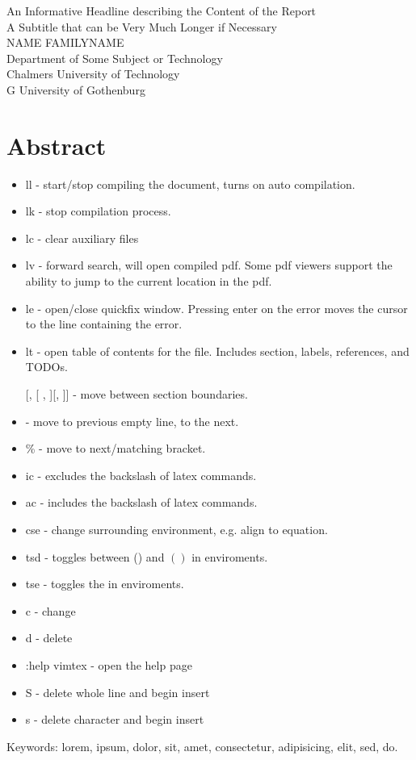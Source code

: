 An Informative Headline describing the Content of the Report\\
A Subtitle that can be Very Much Longer if Necessary\\
NAME FAMILYNAME\\
Department of Some Subject or Technology\\
Chalmers University of Technology\\
\if\InstitutionLocation G
University of Gothenburg\\
\fi
\setlength{\parskip}{0.5cm}

\thispagestyle{plain}			%
\setlength{\parskip}{0pt plus 1.0pt}
\section*{Abstract}

\begin{itemize}
    \item ll - start/stop compiling the document, turns on auto compilation.
    \item lk - stop compilation process. 
    \item lc - clear auxiliary files 
    \item lv - forward search, will open compiled pdf. Some pdf viewers support the ability to jump to the current location in the pdf. 
    \item le - open/close quickfix window. Pressing enter on the error moves the cursor to the line containing the error. 
    \item lt - open table of contents for the file. Includes section, labels, references, and TODOs. 
    \item [[, [], ][, ]] - move between section boundaries. 
    \item { - move to previous empty line, } to the next. 
    \item \% - move to next/matching bracket. 
    \item ic - excludes the backslash of latex commands. 
    \item ac - includes the backslash of latex commands. 
    \item cse - change surrounding environment, e.g. align to equation. 
    \item tsd - toggles between () and \( \left( \right) \) in enviroments.
    \item tse - toggles the \* in enviroments.
    \item c - change 
    \item d - delete 
    \item :help vimtex - open the help page
    \item S - delete whole line and begin insert
    \item s - delete character and begin insert

\end{itemize}



\vfill
Keywords: lorem, ipsum, dolor, sit, amet, consectetur, adipisicing, elit, sed, do.

\newpage				%
\thispagestyle{empty}
\mbox{}
